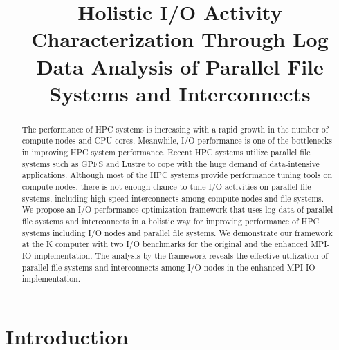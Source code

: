 \documentclass{jhps}
\begin{document}



\title{Holistic I/O Activity Characterization Through Log Data Analysis of Parallel File Systems and Interconnects}


\maketitle

\begin{abstract}
The performance of HPC systems is increasing with a rapid growth in the number of
compute nodes and CPU cores.
Meanwhile, I/O performance is one of the bottlenecks in improving HPC system performance.
Recent HPC systems utilize parallel file systems such as GPFS and Lustre
to cope with the huge demand of data-intensive applications.
Although most of the HPC systems provide performance tuning tools on compute nodes,
there is not enough chance to tune I/O activities on parallel file systems,
including high speed interconnects among compute nodes and file systems.
We propose an I/O performance optimization framework that uses log data of
parallel file systems and interconnects in a holistic way
for improving performance of HPC systems including I/O nodes and parallel file systems.
We demonstrate our framework at the K computer with two I/O benchmarks
for the original and the enhanced MPI-IO implementation.
The analysis by the framework reveals the effective utilization of parallel file systems
and interconnects among I/O nodes in the enhanced MPI-IO implementation.
\end{abstract}


\section{Introduction}
\end{document}
